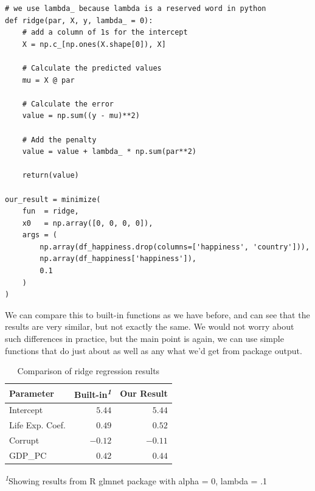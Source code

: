 \documentclass[
  letterpaper,
]{krantz}
\begin{document}
\begin{verbatim}
# we use lambda_ because lambda is a reserved word in python
def ridge(par, X, y, lambda_ = 0):
    # add a column of 1s for the intercept
    X = np.c_[np.ones(X.shape[0]), X]

    # Calculate the predicted values
    mu = X @ par
    
    # Calculate the error
    value = np.sum((y - mu)**2)
    
    # Add the penalty
    value = value + lambda_ * np.sum(par**2)
    
    return(value)

our_result = minimize(
    fun  = ridge,
    x0   = np.array([0, 0, 0, 0]),
    args = (
        np.array(df_happiness.drop(columns=['happiness', 'country'])),
        np.array(df_happiness['happiness']), 
        0.1
    )
)
\end{verbatim}

We can compare this to built-in functions as we have before, and can see
that the results are very similar, but not exactly the same. We would
not worry about such differences in practice, but the main point is
again, we can use simple functions that do just about as well as any
what we'd get from package output.

\setlength{\LTpost}{0mm}

\begin{longtable}{lrr}

\caption{\label{tbl-r-ridge}Comparison of ridge regression results}

\tabularnewline

\toprule
Parameter & Built-in\textsuperscript{\textit{1}} & Our Result \\ 
\midrule\addlinespace[2.5pt]
Intercept & \textcolor[HTML]{404040}{$5.44$} & \textcolor[HTML]{404040}{$5.44$} \\ 
Life Exp. Coef. & \textcolor[HTML]{404040}{$0.49$} & \textcolor[HTML]{404040}{$0.52$} \\ 
Corrupt & \textcolor[HTML]{404040}{$-0.12$} & \textcolor[HTML]{404040}{$-0.11$} \\ 
GDP\_PC & \textcolor[HTML]{404040}{$0.42$} & \textcolor[HTML]{404040}{$0.44$} \\ 
\bottomrule

\end{longtable}

\begin{minipage}{\linewidth}
\textsuperscript{\textit{1}}Showing results from R glmnet package with alpha = 0, lambda = .1\\
\end{minipage}
\end{document}
